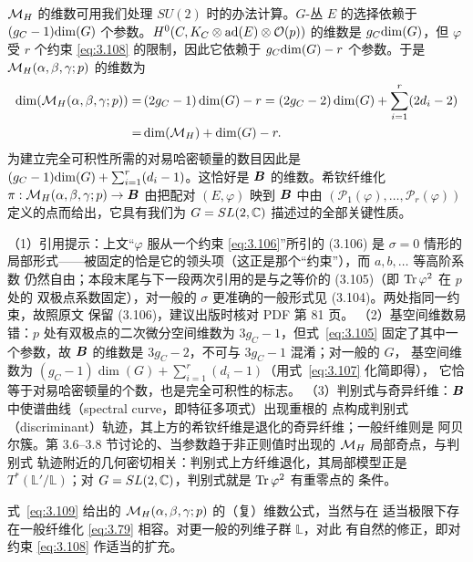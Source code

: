 ${{\mathcal{M}}_H}$ 的维数可用我们处理 $SU(2)$ 时的办法计算。$G$-丛 $E$ 的选择依赖于
$(g_C-1){\rm dim}(G)$ 个参数。$H^0(C,K_C\otimes {\rm ad}(E)\otimes{\mathcal O}(p))$ 的维数是
$g_C{\rm dim}(G)$，但 $\varphi$ 受 $r$ 个约束 \eqref{eq:3.108} 的限制，因此它依赖于
$g_C{\rm dim}(G)-r$ 个参数。于是 ${{\mathcal{M}}_H}(\alpha,\beta,\gamma;p)$ 的维数为
\setcounter{equation}{108}
\begin{equation}\label{eq:3.109}
  \begin{aligned}{\rm dim}({\mathcal{M}}_H(\alpha,\beta,\gamma;p))
=&\,(2g_C-1)\,{\rm dim}(G)-r =(2g_C-2)\,{\rm dim}(G)+\sum_{i=1}^r(2d_i-2)\\=&
\,{\rm dim}({{\mathcal{M}}_H})+{\rm dim}(G)-r.\end{aligned}
\end{equation}
为建立完全可积性所需的对易哈密顿量的数目因此是
$(g_C-1){\rm dim}(G)+\sum_{i=1}^r(d_i-1)$。这恰好是 $\bm{B}$ 的维数。希钦纤维化
$\pi:{{\mathcal{M}}_H}(\alpha,\beta,\gamma;p)\to \bm{B}$ 由把配对 $(E,\varphi)$ 映到 $\bm{B}$ 中由
$({\mathcal P}_1(\varphi),\dots,{\mathcal P}_r(\varphi))$ 定义的点而给出，它具有我们为
$G=SL(2,{\mathbb{C}})$ 描述过的全部关键性质。

\begin{yizhu}[易错点]
（1）引用提示：上文“$\varphi$ 服从一个约束 \eqref{eq:3.106}”所引的 (3.106) 是 $\sigma=0$
情形的局部形式——被固定的恰是它的领头项（这正是那个“约束”），而 $a,b,\dots$ 等高阶系数
仍然自由；本段末尾与下一段两次引用的是与之等价的 (3.105)（即 ${\rm Tr}\,\varphi^2$ 在 $p$ 处的
双极点系数固定），对一般的 $\sigma$ 更准确的一般形式见 (3.104)。两处指同一约束，故照原文
保留 (3.106)，建议出版时核对 PDF 第 81 页。
（2）基空间维数易错：$p$ 处有双极点的二次微分空间维数为 $3g_C-1$，但式~\eqref{eq:3.105}
固定了其中一个参数，故 $\bm{B}$ 的维数是 $3g_C-2$，不可与 $3g_C-1$ 混淆；对一般的 $G$，
基空间维数为 $(g_C-1)\dim(G)+\sum_{i=1}^r(d_i-1)$（用式~\eqref{eq:3.107} 化简即得），
它恰等于对易哈密顿量的个数，也是完全可积性的标志。
（3）判别式与奇异纤维：$\bm{B}$ 中使谱曲线（spectral curve，即特征多项式）出现重根的
点构成判别式（discriminant）轨迹，其上方的希钦纤维是退化的奇异纤维；一般纤维则是
阿贝尔簇。第 3.6--3.8 节讨论的、当参数趋于非正则值时出现的 ${{\mathcal{M}}_H}$ 局部奇点，与判别式
轨迹附近的几何密切相关：判别式上方纤维退化，其局部模型正是
$T^*(\mathbb{L}'/\mathbb{L})$；对 $G=SL(2,{\mathbb{C}})$，判别式就是 ${\rm Tr}\,\varphi^2$ 有重零点的
条件。
\end{yizhu}

式~\eqref{eq:3.109} 给出的 ${{\mathcal{M}}_H}(\alpha,\beta,\gamma;p)$ 的（复）维数公式，当然与在
适当极限下存在一般纤维化 \eqref{eq:3.79} 相容。对更一般的列维子群 $\mathbb{L}$，对此
有自然的修正，即对约束 \eqref{eq:3.108} 作适当的扩充。
